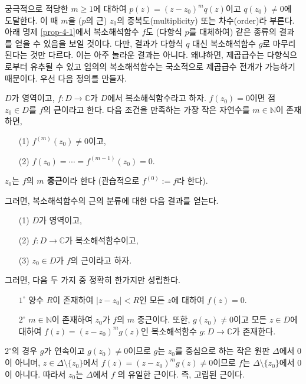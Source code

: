 궁극적으로 적당한 $m\ge1$에 대하여 $p(z) = (z-z_0)^mq(z)$이고  $q(z_0)\ne0$에 도달한다.
이 때 $m$을 ($p$의 근) $z_0$의 중복도(multiplicity) 또는 차수(order)라 부른다.
아래 명제 \ref{prop-4-1}에서 복소해석함수 $f$도 (다항식 $p$를 대체하여)
같은 종류의 결과를 얻을 수 있음을 보일 것이다.
다만, 결과가 다항식 $q$ 대신 복소해석함수 $g$로 마무리된다는 것만 다르다.
이는 아주 놀라운 결과는 아니다. 왜냐하면, 제곱급수는 다항식으로부터 유추될 수 있고
임의의 복소해석함수는 국소적으로 제곱급수 전개가 가능하기 때문이다.
우선 다음 정의를 만들자.

\begin{saltdefinition}{}{} \label{def-4-2}
$D$가 영역이고, $f:D\to\mathbb C$가 $D$에서 복소해석함수라고 하자.
$f(z_0)=0$이면 점 $z_0\in D$를 $f$의 {\bf 근}이라고 한다.
다음 조건을 만족하는 가장 작은 자연수를 $m\in\mathbb N$이 존재하면,
\begin{itemize}
\item[(1)] $f^{(m)}(z_0) \ne 0$이고,
\item[(2)] $f(z_0) = \cdots = f^{(m-1)}(z_0) = 0$.
\end{itemize}
$z_0$는 $f$의 {\bf $m$ 중근}이라 한다 
(관습적으로 $f^{(0)} := f$라 한다).
\end{saltdefinition}

그러면, 복소해석함수의 근의 분류에 대한 다음 결과를 얻는다.


\begin{saltprop} [근의 분류]{}{} \label{prop-4-1}
\begin{itemize}
\item[(1)] $D$가 영역이고,
\item[(2)] $f:D\to\mathbb C$가  복소해석함수이고,
\item[(3)] $z_0 \in D$가 $f$의 근이라고 하자.
\end{itemize}
그러면, 다음 두 가지 중 정확히 한가지만 성립한다.
\begin{itemize}
\item[$1^\circ$] 양수 $R$이 존재하여 $|z-z_0|<R$인 모든 $z$에 대하여
$f(z)=0$.
\item[$2^\circ$] $m\in\mathbb N$이 존재하여
 $z_0$가 $f$의 $m$ 중근이다. 또한, 
 $g(z_0)\ne0$이고 모든 $z\in D$에 대하여 $f(z) = (z-z_0)^mg(z)$인
 복소해석함수 $g:D\to\mathbb C$가 존재한다.
\end{itemize}
\end{saltprop}

$2^\circ$의 경우 $g$가 연속이고 $g(z_0)\ne0$이므로
$g$는 $z_0$를 중심으로 하는 작은 원판 $\Delta$에서 $0$이 아니며,
$z\in \Delta\setminus \{z_0\}$에서 $f(z) = (z-z_0)^mg(z) \ne 0$이므로
$f$는 $\Delta\setminus \{z_0\}$에서 $0$이 아니다.
따라서 $z_0$는 $\Delta$에서 $f$ 의 유일한 근이다. 즉, 고립된 근이다.

